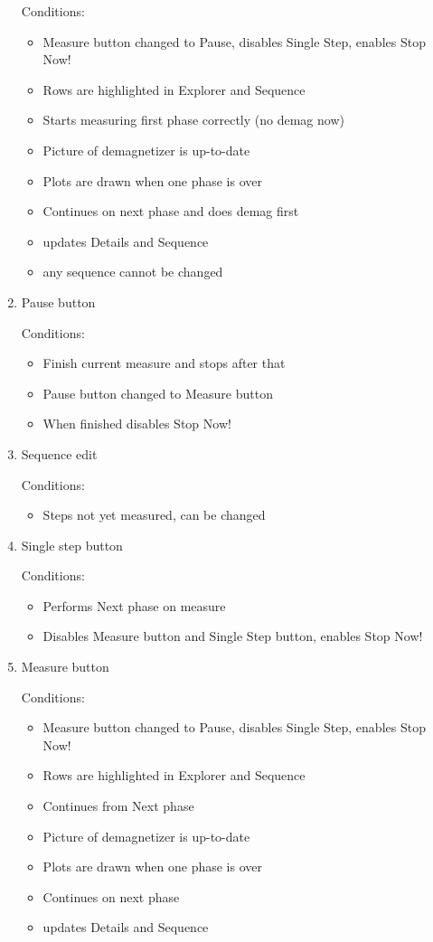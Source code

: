 \begin{enumerate}
Conditions:
\begin{itemize}
\item Measure button changed to Pause, disables Single Step, enables Stop Now!
\item Rows are highlighted in Explorer and Sequence
\item Starts measuring first phase correctly (no demag now)
\item Picture of demagnetizer is up-to-date
\item Plots are drawn when one phase is over
\item Continues on next phase and does demag first
\item updates Details and Sequence
\item any sequence cannot be changed 
\end{itemize}

\item Pause button

Conditions:
\begin{itemize}
\item Finish current measure and stops after that
\item Pause button changed to Measure button
\item When finished disables Stop Now!
\end{itemize}

\item Sequence edit

Conditions:
\begin{itemize}
\item Steps not yet measured, can be changed
\end{itemize}

\item Single step button

Conditions:
\begin{itemize}
\item Performs Next phase on measure
\item Disables Measure button and Single Step button, enables Stop Now!
\end{itemize}

\item Measure button

Conditions:
\begin{itemize}
\item Measure button changed to Pause, disables Single Step, enables Stop Now!
\item Rows are highlighted in Explorer and Sequence
\item Continues from Next phase
\item Picture of demagnetizer is up-to-date
\item Plots are drawn when one phase is over
\item Continues on next phase
\item updates Details and Sequence
\end{itemize}


\end{enumerate}
